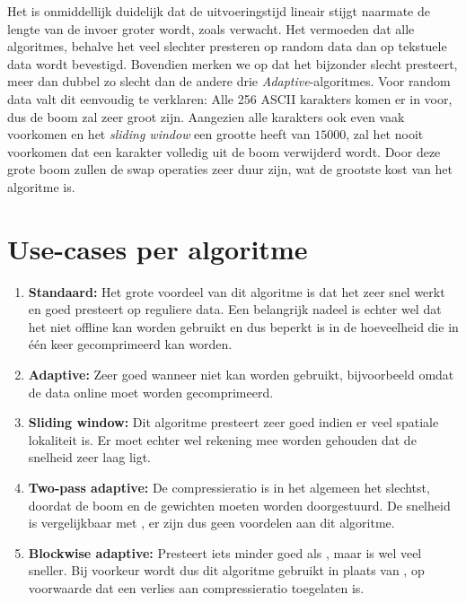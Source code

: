 Het is onmiddellijk duidelijk dat de uitvoeringstijd lineair stijgt naarmate de lengte van de invoer groter wordt, zoals verwacht. Het vermoeden dat alle algoritmes, behalve het \huffstd veel slechter presteren op random data dan op tekstuele data wordt bevestigd. Bovendien merken we op dat het \huffslid bijzonder slecht presteert, meer dan dubbel zo slecht dan de andere drie \emph{Adaptive}-algoritmes. Voor random data valt dit eenvoudig te verklaren: Alle 256 ASCII karakters komen er in voor, dus de boom zal zeer groot zijn. Aangezien alle karakters ook even vaak voorkomen en het \emph{sliding window} een grootte heeft van $15 000$, zal het nooit voorkomen dat een karakter volledig uit de boom verwijderd wordt. Door deze grote boom zullen de swap operaties zeer duur zijn, wat de grootste kost van het algoritme is.

\section{Use-cases per algoritme}
\begin{enumerate}
	\item \textbf{Standaard:} Het grote voordeel van dit algoritme is dat het zeer snel werkt en goed presteert op reguliere data. Een belangrijk nadeel is echter wel dat het niet offline kan worden gebruikt en dus beperkt is in de hoeveelheid die in één keer gecomprimeerd kan worden.
	\item \textbf{Adaptive:} Zeer goed wanneer \huffstd niet kan worden gebruikt, bijvoorbeeld omdat de data online moet worden gecomprimeerd.
	\item \textbf{Sliding window:} Dit algoritme presteert zeer goed indien er veel spatiale lokaliteit is. Er moet echter wel rekening mee worden gehouden dat de snelheid zeer laag ligt.
	\item \textbf{Two-pass adaptive:} De compressieratio is in het algemeen het slechtst, doordat de boom en de gewichten moeten worden doorgestuurd. De snelheid is vergelijkbaar met \huffadap, er zijn dus geen voordelen aan dit algoritme.
	\item \textbf{Blockwise adaptive:} Presteert iets minder goed als \huffslid, maar is wel veel sneller. Bij voorkeur wordt dus dit algoritme gebruikt in plaats van \huffslid, op voorwaarde dat een verlies aan compressieratio toegelaten is.
\end{enumerate}